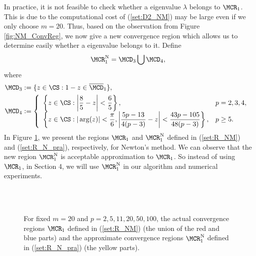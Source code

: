 \begin{remark}
In practice, it is not feasible to check whether a eigenvalue
$\lambda$ belongs to $\MCR_1$. This is due to the computational cost
of (\ref{set:D2_NM}) may be large even if we only choose $m=20$.
Thus, based on the observation from Figure \ref{fig:NM_ConvReg}, we
now give a new convergence region which allows us to determine
easily whether a eigenvalue belongs to it. Define
\begin{equation}
\label{set:R_N_pra} \MCR_1^{\text{N}} = \MCD_3 \bigcup \MCD_4,
\end{equation}
where
\begin{align}
\MCD_3 & := \{z \in \CS: 1-z \in \overline{\MCD}_1 \},\label{set:D3}\\
\MCD_4 & := \left\{
\begin{array}{ll}
\displaystyle \left\{z\in\CS:
\left|\frac{8}{5}-z\right|<\frac{6}{5}\right\},
& p=2,3,4,\\
\displaystyle \left\{z\in\CS: |\arg(z)|<\frac{\pi}{6},
\left|\frac{5p-13}{4(p-3)} - z\right| <
\frac{43p-105}{48(p-3)}\right\}, & p\geq5. \nonumber
\end{array}
\right.
\end{align}
In Figure \ref{fig:NM_PraConvReg}, we present the regions $\MCR_1$
and $\MCR_1^{\text{N}}$ defined in (\ref{set:R_NM}) and
(\ref{set:R_N_pra}), respectively, for Newton's method. We can
observe that the new region $\MCR_1^{\text{N}}$ is acceptable
approximation to $\MCR_1$. So instead of using $\MCR_1$, in Section
4, we will use $\MCR_1^{\text{N}}$ in our algorithm and numerical
experiments.
\end{remark}


\begin{figure}[h!]
\centering
{}
\\
\\
\caption{For fixed $m=20$ and $p=2,5,11,20,50,100$, the actual
convergence regions $\MCR_1$ defined in (\ref{set:R_NM}) (the union
of the red and blue parts) and the approximate convergence regions
$\MCR_1^{\text{N}}$ defined in (\ref{set:R_N_pra}) (the yellow
parts).}\label{fig:NM_PraConvReg}
\end{figure}








